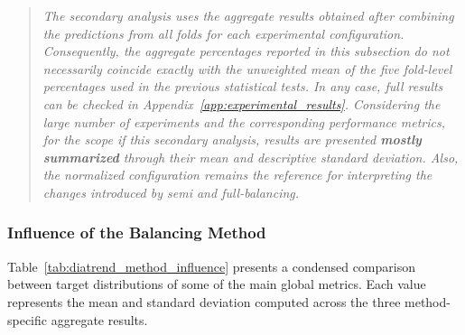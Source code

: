 \begin{quote}
\small
\textit{The secondary analysis uses the aggregate results obtained after combining the predictions from all folds for each experimental configuration. Consequently, the aggregate percentages reported in this subsection do not necessarily coincide exactly with the unweighted mean of the five fold-level percentages used in the previous statistical tests. In any case, full results can be checked in Appendix~\ref{app:experimental_results}. Considering the large number of experiments and the corresponding performance metrics, for the scope if this secondary analysis, results are presented \textbf{mostly summarized} through their mean and descriptive standard deviation. Also, the normalized configuration remains the reference for interpreting the changes introduced by semi and full-balancing.}
\end{quote}

\subsubsection{Influence of the Balancing Method}
\label{subsubsec:diatrend_method_influence}

Table~\ref{tab:diatrend_method_influence} presents a condensed comparison between target distributions of some of the main global metrics. Each value represents the mean and standard deviation computed across the three method-specific aggregate results.

\begin{table}[htbp]
    \centering
    \caption{Main DiaTrend results.}
    \label{tab:diatrend_method_influence}
\end{table}


